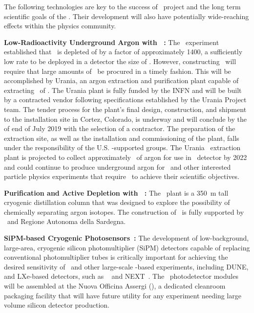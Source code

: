 The following technologies are key to the success of \DSk\ project and the long term scientific goals of the \GADMC. Their development will also have potentially wide-reaching effects within the physics community.

{\bf Low-Radioactivity Underground Argon with \Urania~\cite{Aalseth:2018gq}:} 
The \DSfs\ experiment established that \UAr\ is depleted of  by a factor of approximately 1400, a sufficiently low rate to be deployed in a detector the size of \DSks. However, constructing \DSks\ will require that large amounts of \UAr\ be procured in a timely fashion. This will be accomplished by Urania, an argon extraction and purification plant capable of extracting \UraniaUArRate\ of \UAr.  The Urania plant is fully funded by the INFN and will be built by a contracted vendor following specifications established by the Urania Project team. The tender process for the plant's final design, construction, and shipment to the installation site in Cortez, Colorado, is underway and will conclude by the of end of July 2019 with the selection of a contractor.  The preparation of the extraction site, as well as the installation and commissioning of the plant, falls under the responsibility of the U.S. \NSF-supported groups.  The Urania \UAr\ extraction plant is projected to collect approximately \UraniaTotalDSkProduction\ of argon for use in \DSks\ detector by 2022 and could continue to produce underground argon for \Argo\ and other interested particle physics experiments that require \UAr\ to achieve their scientific objectives.  

{\bf Purification and Active Depletion with \Aria~\cite{Aalseth:2018gq}:}
The \Aria\ plant is a \SI{350}{\m} tall cryogenic distillation column that was designed to explore the possibility of chemically separating argon isotopes.  The construction of \Aria\ is fully supported by \INFN\ and Regione Autonoma della Sardegna. 

{\bf SiPM-based Cryogenic Photosensors~\cite{Aalseth:2018gq,DIncecco:2018hy,DIncecco:2018fx}:}
The development of low-background, large-area, cryogenic silicon photomultiplier (SiPM) detectors capable of replacing conventional photomultiplier tubes is critically important for achieving the desired sensitivity of \DSks\ and other large-scale \LAr-based experiments, including DUNE, and LXe-based detectors, such as \nEXO~\cite{Ostrovskiy:2015jl} and NEXT~\cite{Cebrian:2017dy,GomezCadenas:2016cm,Cebrian:2015du}.  The \DSks\ photodetector modules will be assembled at the Nuova Officina Assergi (\NOA), a dedicated cleanroom packaging facility that will have future utility for any experiment needing large volume silicon detector production.

